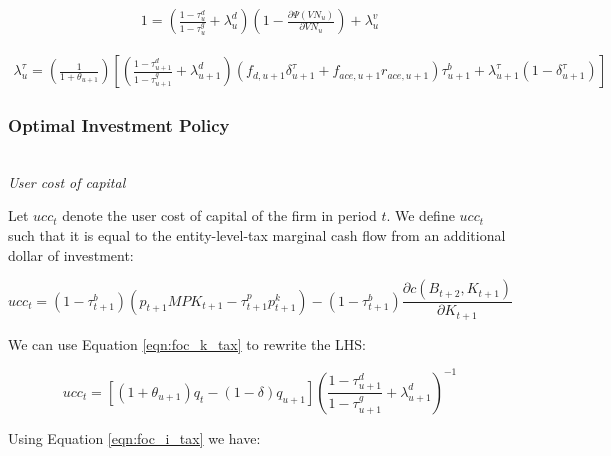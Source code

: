 \begin{equation}
\label{eqn:foc_vn_tax}
\begin{split}
1 = \left(\frac{1-\tau^{d}_{u}}{1-\tau^{g}_{u}} + \lambda^{d}_{u}\right)\left(1-\frac{\partial \Psi(VN_{u})}{\partial VN_{u}}\right) + \lambda^{v}_{u}
 \end{split}
\end{equation}

 \begin{equation}
\label{eqn:foc_ktau_tax}
\begin{split}
 \lambda^{\tau}_{u} = \left(\frac{1}{1+\theta_{u+1}}\right)\left[\left(\frac{1-\tau^{d}_{u+1}}{1-\tau^{g}_{u+1}} + \lambda^{d}_{u+1} \right)\left(f_{d,u+1}\delta^{\tau}_{u+1}+f_{ace,u+1}r_{ace,u+1}\right)\tau^{b}_{u+1} + \lambda^{\tau}_{u+1}(1-\delta^{\tau}_{u+1})\right] 
 \end{split}
\end{equation}



\subsubsection{Optimal Investment Policy}

\ \\
\noindent\noindent \emph{User cost of capital}

Let $ucc_{t}$ denote the user cost of capital of the firm in period $t$.  We define $ucc_{t}$ such that it is equal to the entity-level-tax marginal cash flow from an additional dollar of investment:

\begin{equation}
ucc_{t} = (1-\tau^{b}_{t+1})\left(p_{t+1}MPK_{t+1}-\tau^{p}_{t+1}p^{k}_{t+1}\right)- (1-\tau^{b}_{t+1}) \frac{\partial c(B_{t+2},K_{t+1})}{\partial K_{t+1}}
\end{equation}


We can use Equation \ref{eqn:foc_k_tax} to rewrite the LHS:

\begin{equation}
ucc_{t} =  \left[\left({1+\theta_{u+1}}\right)q_{t} - (1-\delta)q_{u+1}\right] \left(\frac{1-\tau^{d}_{u+1}}{1-\tau^{g}_{u+1}} + \lambda^{d}_{u+1} \right)^{-1}
\end{equation}

Using Equation \ref{eqn:foc_i_tax} we have:

